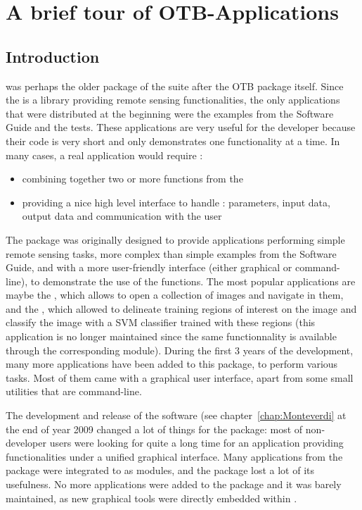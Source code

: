 \chapter{A brief tour of OTB-Applications}\label{chap:otb-applications}

\section{Introduction}\label{sec:appintro}

\app was perhaps the older package of the \otb suite after the OTB
package itself. Since the \otb is a library providing remote sensing
functionalities, the only applications that were distributed at the
beginning were the examples from the Software Guide and the
tests. These applications are very useful for the developer because
their code is very short and only demonstrates one functionality at a
time. In many cases, a real application would require :
\begin{itemize}
\item combining together two or more functions from the \otb
\item providing a nice high level interface to handle : parameters, input data,
output data and communication with the user
\end{itemize}

The \app package was originally designed to provide applications
performing simple remote sensing tasks, more complex than simple
examples from the Software Guide, and with a more user-friendly
interface (either graphical or command-line), to demonstrate the use
of the \otb functions. The most popular applications are maybe the
, which allows to open a collection
of images and navigate in them, and the
, which allowed to
delineate training regions of interest on the image and classify the
image with a SVM classifier trained with these regions (this
application is no longer maintained since the same functionnality is
available through the corresponding \mont module). During the first 3
years of the \otb development, many more applications have been added
to this package, to perform various tasks. Most of them came with a
graphical user interface, apart from some small utilities that are
command-line.

The development and release of the \mont software (see
chapter~\ref{chap:Monteverdi} at the end of year 2009 changed a lot of
things for the \app package: most of non-developer users were looking
for quite a long time for an application providing \otb
functionalities under a unified graphical interface. Many applications
from the \app package were integrated to \mont as modules, and the
\app package lost a lot of its usefulness. No more applications were
added to the package and it was barely maintained, as new graphical
tools were directly embedded within \mont.


